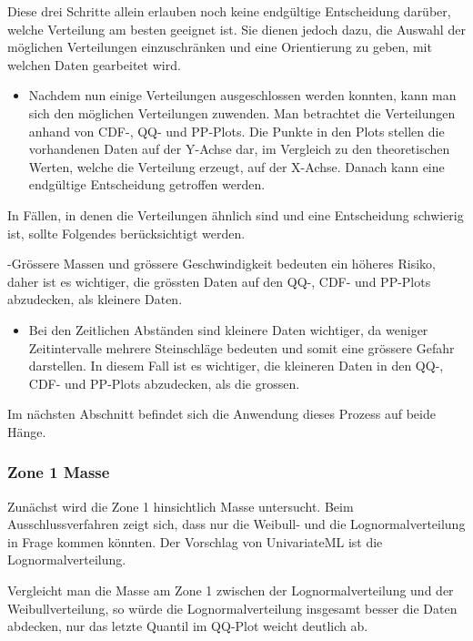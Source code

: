 \documentclass[
  letterpaper,
  DIV=11,
  numbers=noendperiod]{scrartcl}
\providecommand{\tightlist}{%
  \setlength{\itemsep}{0pt}\setlength{\parskip}{0pt}}\usepackage{longtable,booktabs,array}
\begin{document}
Diese drei Schritte allein erlauben noch keine endgültige Entscheidung
darüber, welche Verteilung am besten geeignet ist. Sie dienen jedoch
dazu, die Auswahl der möglichen Verteilungen einzuschränken und eine
Orientierung zu geben, mit welchen Daten gearbeitet wird.

\begin{itemize}
\tightlist
\item
  Nachdem nun einige Verteilungen ausgeschlossen werden konnten, kann
  man sich den möglichen Verteilungen zuwenden. Man betrachtet die
  Verteilungen anhand von CDF-, QQ- und PP-Plots. Die Punkte in den
  Plots stellen die vorhandenen Daten auf der Y-Achse dar, im Vergleich
  zu den theoretischen Werten, welche die Verteilung erzeugt, auf der
  X-Achse. Danach kann eine endgültige Entscheidung getroffen werden.
\end{itemize}

In Fällen, in denen die Verteilungen ähnlich sind und eine Entscheidung
schwierig ist, sollte Folgendes berücksichtigt werden.

-Grössere Massen und grössere Geschwindigkeit bedeuten ein höheres
Risiko, daher ist es wichtiger, die grössten Daten auf den QQ-, CDF- und
PP-Plots abzudecken, als kleinere Daten.

\begin{itemize}
\tightlist
\item
  Bei den Zeitlichen Abständen sind kleinere Daten wichtiger, da weniger
  Zeitintervalle mehrere Steinschläge bedeuten und somit eine grössere
  Gefahr darstellen. In diesem Fall ist es wichtiger, die kleineren
  Daten in den QQ-, CDF- und PP-Plots abzudecken, als die grossen.
\end{itemize}

Im nächsten Abschnitt befindet sich die Anwendung dieses Prozess auf
beide Hänge.

\subsubsection{Zone 1 Masse}\label{zone-1-masse}

Zunächst wird die Zone 1 hinsichtlich Masse untersucht. Beim
Ausschlussverfahren zeigt sich, dass nur die Weibull- und die
Lognormalverteilung in Frage kommen könnten. Der Vorschlag von
UnivariateML ist die Lognormalverteilung.

Vergleicht man die Masse am Zone 1 zwischen der Lognormalverteilung und
der Weibullverteilung, so würde die Lognormalverteilung insgesamt besser
die Daten abdecken, nur das letzte Quantil im QQ-Plot weicht deutlich
ab.
\end{document}
